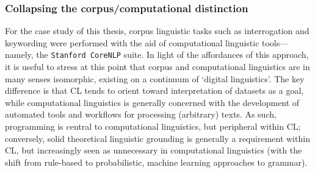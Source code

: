 
\subsubsection{Collapsing the corpus\slash computational distinction}

For the case study of this thesis, corpus linguistic tasks such as interrogation and keywording were performed with the aid of computational linguistic tools---namely, the \texttt{Stanford CoreNLP} suite. In light of the affordances of this approach, it is useful to stress at this point that corpus and computational linguistics are in many senses isomorphic, existing on a continuum of `digital linguistics'. The key difference is that \gls{CL} tends to orient toward interpretation of datasets as a goal, while computational linguistics is generally concerned with the development of automated tools and workflows for processing (arbitrary) texts. As such, programming is central to computational linguistics, but peripheral within \gls{CL}; conversely, solid theoretical linguistic grounding is generally a requirement within \gls{CL}, but increasingly seen as unnecessary in computational linguistics (with the shift from rule\hyp{}based to probabilistic, machine learning approaches to grammar).

